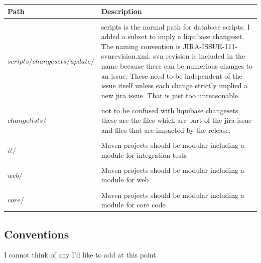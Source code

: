 \documentclass[12pt,notitlepage]{article}
\begin{document}
\noindent \begin{tabular}{l|p{7.5cm}}
Path & Description \\
\hline \\
$scripts/changesets/update/$ & scripts is the normal path for database
scripts. I added a subset to imply a liquibase changeset. The naming
convention is JIRA-ISSUE-111-svnrevision.xml. svn revision is included
in the name because there can be numerious changes to an issue. These
need to be independent of the issue itself unless each change strictly
implied a new jira issue. That is just too unreasonable.\\
\hline \\
 $changelists/$ & not to be confused with liquibase changesets, these are
the files which are part of the jira issue and files that are impacted
by the release. \\
\hline \\
$it/$ & Maven projects should be modular including a module for
integration tests\\
\hline \\
$web/$ & Maven projects should be modular including a module for
web \\
\hline \\
$core/$ & Maven projects should be modular including a module for
core code 
\end{tabular}

\subsection{Conventions}
I cannot think of any I'd like to add at this point
\end{document}
